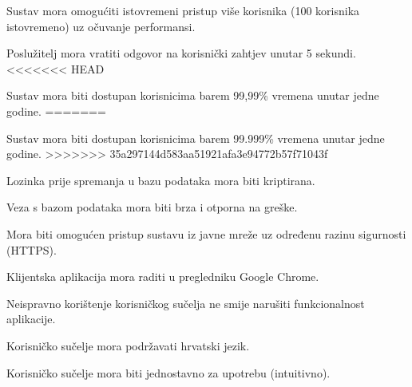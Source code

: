 			 \begin{packed_item}
			 	\item Sustav mora omogućiti istovremeni pristup više korisnika (100 korisnika istovremeno) uz očuvanje performansi.
			 	\item Poslužitelj mora vratiti odgovor na korisnički zahtjev unutar 5 sekundi.
<<<<<<< HEAD
			 	\item Sustav mora biti dostupan korisnicima barem 99,99\% vremena unutar jedne godine.
=======
			 	\item Sustav mora biti dostupan korisnicima barem 99.999\% vremena unutar jedne godine.
>>>>>>> 35a297144d583aa51921afa3e94772b57f71043f
			 	\item Lozinka prije spremanja u bazu podataka mora biti kriptirana.
			 	\item Veza s bazom podataka mora biti brza i otporna na greške.
			 	\item Mora biti omogućen pristup sustavu iz javne mreže uz određenu razinu sigurnosti (HTTPS).
			 	\item Klijentska aplikacija mora raditi u pregledniku Google Chrome.
			 	\item Neispravno korištenje korisničkog sučelja ne smije narušiti funkcionalnost aplikacije.
			 	\item Korisničko sučelje mora podržavati hrvatski jezik.
			 	\item Korisničko sučelje mora biti jednostavno za upotrebu (intuitivno).
			 \end{packed_item}
			 
			 
			 
	